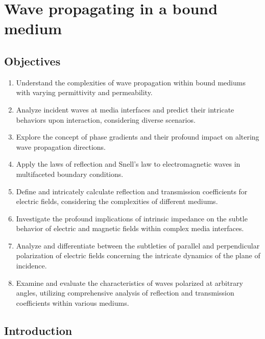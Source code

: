  \chapter{Wave propagating in a bound medium}\label{lec:lec30}

\begin{mdframed}[backgroundcolor=lightblue, linewidth=1pt, hidealllines=true]
    \section{Objectives}
    \begin{enumerate}[label=\roman*., itemsep=0pt, topsep=0pt]
        \item Understand the complexities of wave propagation within bound mediums with varying permittivity and permeability.
        \item Analyze incident waves at media interfaces and predict their intricate behaviors upon interaction, considering diverse scenarios.
        \item Explore the concept of phase gradients and their profound impact on altering wave propagation directions.
        \item Apply the laws of reflection and Snell's law to electromagnetic waves in multifaceted boundary conditions.
        \item Define and intricately calculate reflection and transmission coefficients for electric fields, considering the complexities of different mediums.
        \item Investigate the profound implications of intrinsic impedance on the subtle behavior of electric and magnetic fields within complex media interfaces.
        \item Analyze and differentiate between the subtleties of parallel and perpendicular polarization of electric fields concerning the intricate dynamics of the plane of incidence.
        \item Examine and evaluate the characteristics of waves polarized at arbitrary angles, utilizing comprehensive analysis of reflection and transmission coefficients within various mediums.
    \end{enumerate}
\end{mdframed}

\section{Introduction}

